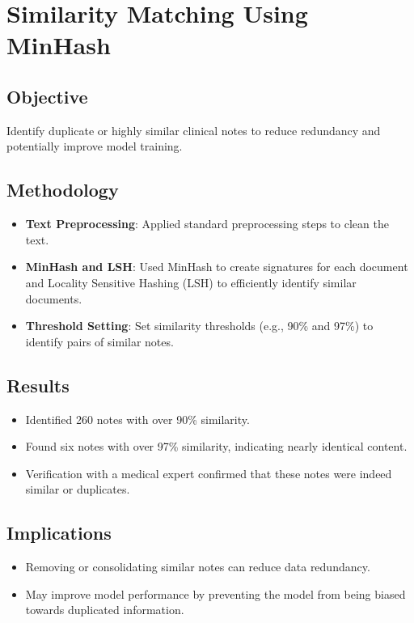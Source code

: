 \section{Similarity Matching Using MinHash}

\subsection{Objective}
Identify duplicate or highly similar clinical notes to reduce redundancy and potentially improve model training.

\subsection{Methodology}
\begin{itemize}
    \item \textbf{Text Preprocessing}: Applied standard preprocessing steps to clean the text.
    \item \textbf{MinHash and LSH}: Used MinHash to create signatures for each document and Locality Sensitive Hashing (LSH) to efficiently identify similar documents.
    \item \textbf{Threshold Setting}: Set similarity thresholds (e.g., 90\% and 97\%) to identify pairs of similar notes.
\end{itemize}

\subsection{Results}
\begin{itemize}
    \item Identified 260 notes with over 90\% similarity.
    \item Found six notes with over 97\% similarity, indicating nearly identical content.
    \item Verification with a medical expert confirmed that these notes were indeed similar or duplicates.
\end{itemize}

\subsection{Implications}
\begin{itemize}
    \item Removing or consolidating similar notes can reduce data redundancy.
    \item May improve model performance by preventing the model from being biased towards duplicated information.
\end{itemize}

